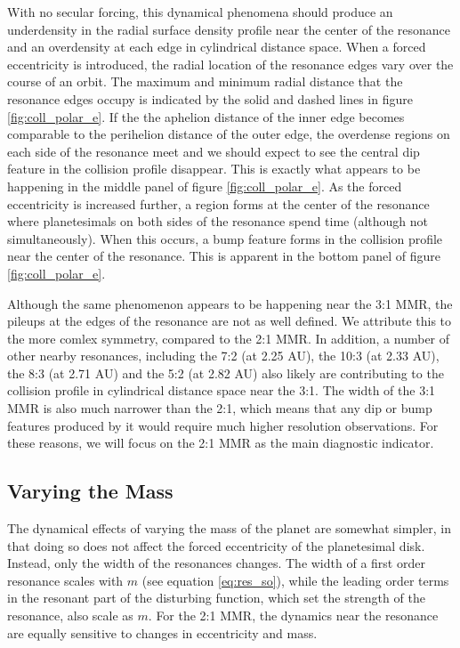 \documentclass[twocolumn]{aastex63}
\begin{document}
With no secular forcing, this dynamical phenomena should produce an underdensity in the radial surface density profile near the center of the 
resonance and an overdensity at each edge in cylindrical distance space. When a forced eccentricity is introduced, the radial location of the 
resonance edges vary over the course of an orbit. The maximum and minimum radial distance that the resonance edges occupy is indicated by the 
solid and dashed lines in figure \ref{fig:coll_polar_e}. If the the aphelion distance of the inner edge becomes comparable to the perihelion distance of 
the outer edge, the overdense regions on each side of the resonance meet and we should expect to see the central dip feature in the collision profile 
disappear. This is exactly what appears to be happening in the middle panel of figure \ref{fig:coll_polar_e}. As the forced eccentricity is increased 
further, a region forms at the center of the resonance where planetesimals on both sides of the resonance spend time (although not simultaneously). 
When this occurs, a bump feature forms in the collision profile near the center of the resonance. This is apparent in the bottom panel of figure 
\ref{fig:coll_polar_e}.

Although the same phenomenon appears to be happening near the 3:1 MMR, the pileups at the edges of the resonance are not as well defined. We 
attribute this to the more comlex symmetry, compared to the 2:1 MMR. In addition, a number of other nearby resonances, including the 7:2 (at 
2.25 AU), the 10:3 (at 2.33 AU), the 8:3 (at 2.71 AU) and the 5:2 (at 2.82 AU) also likely are contributing to the collision profile in cylindrical distance 
space near the 3:1. The width of the 3:1 MMR is also much narrower than the 2:1, which means that any dip or bump features produced by it would 
require much higher resolution observations. For these reasons, we will focus on the 2:1 MMR as the main diagnostic indicator.

\subsection{Varying the Mass}

The dynamical effects of varying the mass of the planet are somewhat simpler, in that doing so does not affect the forced eccentricity of the 
planetesimal disk. Instead, only the width of the resonances changes. The width of a first order resonance scales with $m$ (see equation 
\ref{eq:res_so}), while the leading order terms in the resonant part of the disturbing function, which set the strength of the resonance, also scale as 
$m$. For the 2:1 MMR, the dynamics near the resonance are equally sensitive to changes in eccentricity and mass.
\end{document}
